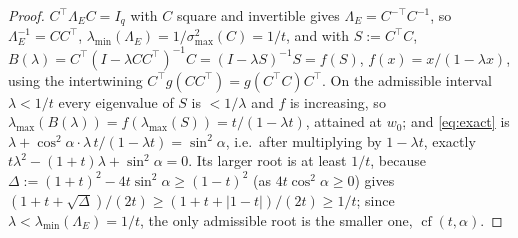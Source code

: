 \documentclass[11pt]{article}
\theoremstyle{remark}
\newcommand{\Le}{\Lambda_E}
\begin{document}
\begin{proof}
$C^{\top}\Le C=I_q$ with $C$ square and invertible gives $\Le=C^{-\top}C^{-1}$, so
$\Le^{-1}=CC^{\top}$, $\lambda_{\min}(\Le)=1/\sigma_{\max}^2(C)=1/t$, and with $S:=C^{\top}C$,
$B(\lambda)=C^{\top}(I-\lambda CC^{\top})^{-1}C=(I-\lambda S)^{-1}S=f(S)$, $f(x)=x/(1-\lambda x)$,
using the intertwining $C^{\top}g(CC^{\top})=g(C^{\top}C)C^{\top}$. On the admissible interval
$\lambda<1/t$ every eigenvalue of $S$ is $<1/\lambda$ and $f$ is increasing, so
$\lambda_{\max}(B(\lambda))=f(\lambda_{\max}(S))=t/(1-\lambda t)$, attained at $w_0$; and
\eqref{eq:exact} is $\lambda+\cos^2\alpha\cdot\lambda\,t/(1-\lambda t)=\sin^2\alpha$, i.e.\
after multiplying by $1-\lambda t$, exactly $t\lambda^2-(1+t)\lambda+\sin^2\alpha=0$. Its larger
root is at least $1/t$, because $\Delta:=(1+t)^2-4t\sin^2\alpha\ge(1-t)^2$ (as
$4t\cos^2\alpha\ge0$) gives $(1+t+\sqrt\Delta)/(2t)\ge(1+t+\lvert1-t\rvert)/(2t)\ge1/t$; since
$\lambda<\lambda_{\min}(\Le)=1/t$, the only admissible root is the smaller one,
$\operatorname{cf}(t,\alpha)$.
\end{proof}
\end{document}
